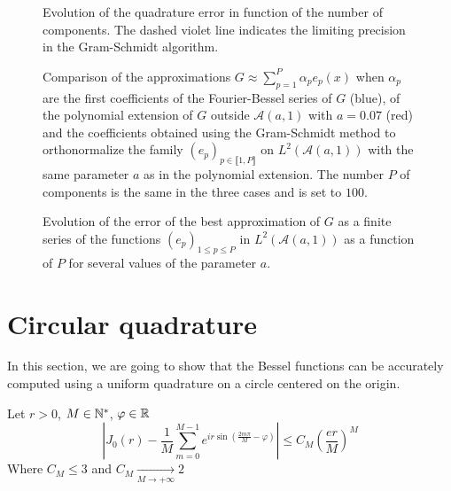 \documentclass[11pt,a4paper]{article}
\begin{document}
\begin{figure}[H]
\centering 

\caption{Evolution of the quadrature error in function of the number of components. The dashed violet line indicates the limiting precision in the Gram-Schmidt algorithm. }
\label{compareApprox2}
\end{figure}

\begin{figure}[H]
\centering
\subfigure[Logarithmic error $e = \log\left(\left|G(x) - \displaystyle\sum_{p=1}^P \alpha_p e_p(x)\right|\right)$]{\label{fig:compareApprox1a}}
\caption{Comparison of the approximations $G \approx \displaystyle\sum_{p=1}^P \alpha_p e_p(x)$ when $\alpha_p$ are the first coefficients of the Fourier-Bessel series of $G$ (blue), of the polynomial extension of $G$  outside $\mathcal{A}(a,1)$ with $a = 0.07$ (red) and the coefficients obtained using the Gram-Schmidt method to orthonormalize the family $(e_p)_{p\in\llbracket 1,P\rrbracket}$ on $L^2\left(\mathcal{A}(a,1)\right)$ with the same parameter $a$ as in the polynomial extension. The number $P$ of components is the same in the three cases and is set to $100$. }
\label{compareApprox1}
\end{figure}



\begin{figure}
\centering

\caption{Evolution of the error of the best approximation of $G$ as a finite series of the functions $(e_p)_{1\leq p \leq P}$ in $L^2(\mathcal{A}(a,1))$ as a function of $P$ for several values of the parameter $a$.}
\end{figure}

\section{Circular quadrature}
\label{Sec:circularQuad}
In this section, we are going to show that the Bessel functions can be accurately computed using a uniform quadrature on a circle centered on the origin. 

\begin{Prop} Let $r>0$, $M\in \mathbb{N}^*$, $\varphi \in \mathbb{R}$ 
\[\left|J_0(r) -  \dfrac{1}{M}\sum_{m=0}^{M-1}e^{ir\sin\left(\frac{2m\pi}{M}-\varphi\right)} \right| \leq C_M \left(\dfrac{er}{M}\right)^M\]
Where $C_M \leq 3$ and $C_M \underset{M\to+\infty}{\longrightarrow} 2$
\label{QuadratureCirc}
\end{Prop}
\end{document}
